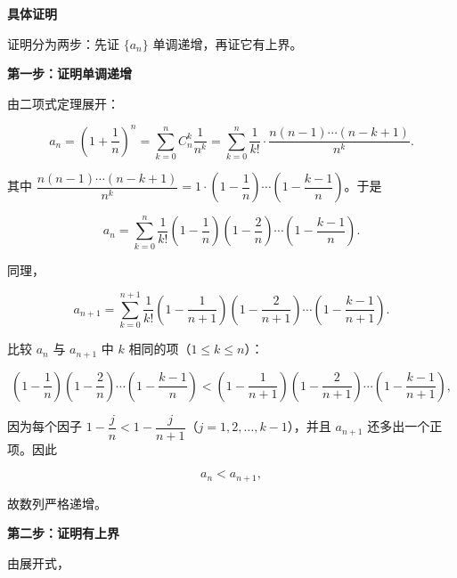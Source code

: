 \documentclass[fontset=fandol]{ctexart}
\newenvironment{custom}[1]{\par\noindent\textbf{#1}\quad}{\par\vspace{0.8em}}
\begin{document}
\begin{custom}{具体证明}

	证明分为两步：先证 \(\{a_n\}\) 单调递增，再证它有上界。

	

	\noindent\textbf{第一步：证明单调递增}

	

	由二项式定理展开：

	\[

	a_n = \left(1+\dfrac{1}{n}\right)^n = \sum\limits_{k=0}^{n} C_n^k \dfrac{1}{n^k} = \sum_{k=0}^{n} \dfrac{1}{k!} \cdot \dfrac{n(n-1)\cdots(n-k+1)}{n^k}.

	\]

	其中 \(\dfrac{n(n-1)\cdots(n-k+1)}{n^k} = 1 \cdot \left(1-\dfrac{1}{n}\right) \cdots \left(1-\dfrac{k-1}{n}\right)\)。于是

	\[

	a_n = \sum_{k=0}^{n} \dfrac{1}{k!} \left(1-\dfrac{1}{n}\right)\left(1-\dfrac{2}{n}\right)\cdots\left(1-\dfrac{k-1}{n}\right).

	\]

	

	同理，

	\[

	a_{n+1} = \sum_{k=0}^{n+1} \dfrac{1}{k!} \left(1-\dfrac{1}{n+1}\right)\left(1-\dfrac{2}{n+1}\right)\cdots\left(1-\dfrac{k-1}{n+1}\right).

	\]

	

	比较 \(a_n\) 与 \(a_{n+1}\) 中 \(k\) 相同的项（\(1 \leq k \leq n\)）：

	\[

	\left(1-\dfrac{1}{n}\right)\left(1-\dfrac{2}{n}\right)\cdots\left(1-\dfrac{k-1}{n}\right) < \left(1-\dfrac{1}{n+1}\right)\left(1-\dfrac{2}{n+1}\right)\cdots\left(1-\dfrac{k-1}{n+1}\right),

	\]

	因为每个因子 \(1-\dfrac{j}{n}<1-\dfrac{j}{n+1}\)（\(j=1,2,\dots,k-1\)），并且 \(a_{n+1}\) 还多出一个正项。因此

	\[

	a_n < a_{n+1},

	\]

	故数列严格递增。

	

	\noindent\textbf{第二步：证明有上界}

	

	由展开式，

	\[

\]
\end{custom}
\end{document}
